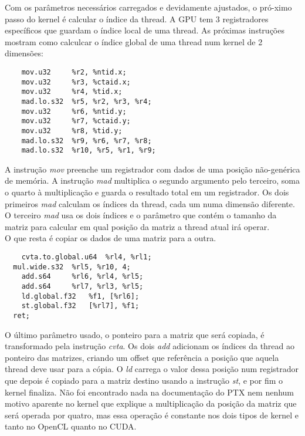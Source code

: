 Com os parâmetros necessários carregados e devidamente ajustados, o pró-\newline ximo passo do kernel é calcular o índice da thread. A GPU tem 3 registradores
específicos que guardam o índice local de uma thread. As próximas instruções mostram como calculcar o índice global de uma thread num kernel de 
2 dimensões:

\begin{lstlisting}
    mov.u32 	%r2, %ntid.x;
    mov.u32 	%r3, %ctaid.x;
    mov.u32 	%r4, %tid.x;
    mad.lo.s32 	%r5, %r2, %r3, %r4;
    mov.u32 	%r6, %ntid.y;
    mov.u32 	%r7, %ctaid.y;
    mov.u32 	%r8, %tid.y;
    mad.lo.s32 	%r9, %r6, %r7, %r8;
    mad.lo.s32 	%r10, %r5, %r1, %r9;
\end{lstlisting}

A instrução \textit{mov} preenche um registrador com dados de uma posição não-genérica de memória. A instrução \textit{mad} multiplica o segundo argumento
pelo terceiro, soma o quarto à multiplicação e guarda o resultado total em um registrador. Os dois primeiros \textit{mad} calculam os índices da thread,
cada um numa dimensão diferente. O terceiro \textit{mad} usa os dois índices e o parâmetro que contém o tamanho da matriz para calcular em qual posição da 
matriz a thread atual irá operar. \\

O que resta é copiar os dados de uma matriz para a outra.

\begin{lstlisting}
	cvta.to.global.u64 	%rl4, %rl1;
  mul.wide.s32 	%rl5, %r10, 4;
	add.s64 	%rl6, %rl4, %rl5;
	add.s64 	%rl7, %rl3, %rl5;
	ld.global.f32 	%f1, [%rl6];
	st.global.f32 	[%rl7], %f1;
  ret;
\end{lstlisting}

O último parâmetro usado, o ponteiro para a matriz que será copiada, é transformado pela instrução \textit{cvta}. Os dois \textit{add} adicionam os índices
da thread ao ponteiro das matrizes, criando um offset que referência a posição que aquela thread deve usar para a cópia. O \textit{ld} carrega o valor dessa
posição num registrador que depois é copiado para a matriz destino usando a instrução \textit{st}, e por fim o kernel finaliza. Não foi encontrado nada
na documentação do PTX nem nenhum motivo aparente no kernel que explique a multiplicação da posição da matriz que será operada por quatro, mas essa operação
é constante nos dois tipos de kernel e tanto no OpenCL quanto no CUDA.
